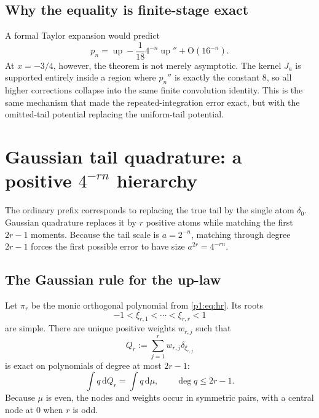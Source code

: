 \documentclass[11pt]{article}
\numberwithin{equation}{section}
\theoremstyle{definition}
\theoremstyle{remark}
\newcommand{\Up}{\operatorname{up}}
\newcommand{\dd}{\,\mathrm d}
\newcommand{\Oh}{\mathrm O}
\begin{document}
\subsection{Why the equality is finite-stage exact}

A formal Taylor expansion would predict
\[
 p_n=\Up-\frac1{18}4^{-n}\Up''+\Oh(16^{-n}).
\]
At $x=-3/4$, however, the theorem is not merely asymptotic.  The kernel $J_a$ is supported entirely inside a region where $p_n''$ is exactly the constant $8$, so all higher corrections collapse into the same finite convolution identity.  This is the same mechanism that made the repeated-integration error exact, but with the omitted-tail potential replacing the uniform-tail potential.

\section{Gaussian tail quadrature: a positive $4^{-rn}$ hierarchy}
\label{p1:sec:gaussian}

The ordinary prefix corresponds to replacing the true tail by the single atom $\delta_0$.  Gaussian quadrature replaces it by $r$ positive atoms while matching the first $2r-1$ moments.  Because the tail scale is $a=2^{-n}$, matching through degree $2r-1$ forces the first possible error to have size $a^{2r}=4^{-rn}$.

\subsection{The Gaussian rule for the up-law}

Let $\pi_r$ be the monic orthogonal polynomial from \eqref{p1:eq:hr}.  Its roots
\begin{equation}
 -1<\xi_{r,1}<\cdots<\xi_{r,r}<1
 \label{p1:eq:gauss-nodes}
\end{equation}
are simple.  There are unique positive weights $w_{r,j}$ such that
\begin{equation}
 Q_r:=\sum_{j=1}^{r}w_{r,j}\delta_{\xi_{r,j}}
 \label{p1:eq:Qr}
\end{equation}
is exact on polynomials of degree at most $2r-1$:
\begin{equation}
 \int q\dd Q_r=\int q\dd\mu,
 \qquad \deg q\le2r-1.
 \label{p1:eq:Gauss-exactness}
\end{equation}
Because $\mu$ is even, the nodes and weights occur in symmetric pairs, with a central node at $0$ when $r$ is odd.
\end{document}
